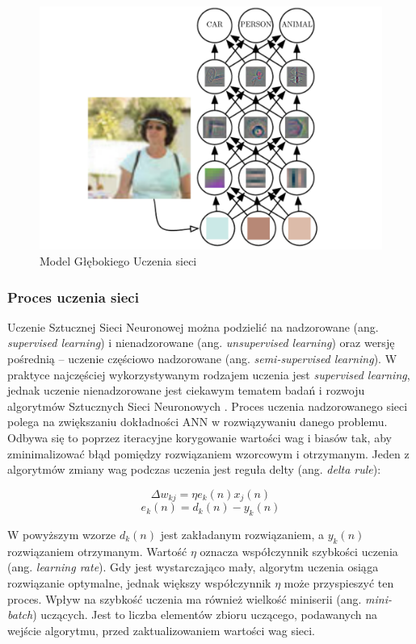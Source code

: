 \begin{figure}[!h]
  \centering
  \includegraphics[width=\textwidth]{img/dnn-object-recog.png}
  \caption{Model Głębokiego Uczenia sieci}
  \label{dnn}
\end{figure}


\subsubsection{Proces uczenia sieci}

Uczenie Sztucznej Sieci Neuronowej można podzielić na nadzorowane (ang. \emph{supervised learning}) i nienadzorowane (ang. \emph{unsupervised learning}) oraz wersję pośrednią -- uczenie częściowo nadzorowane (ang. \emph{semi-supervised learning}). W praktyce najczęściej wykorzystywanym rodzajem uczenia jest \emph{supervised learning}, jednak uczenie nienadzorowane jest ciekawym tematem badań i rozwoju algorytmów Sztucznych Sieci Neuronowych \cite{nielsen2015neural}.
Proces uczenia nadzorowanego sieci polega na zwiększaniu dokładności ANN w rozwiązywaniu danego problemu. Odbywa się to poprzez iteracyjne korygowanie wartości wag i biasów tak, aby zminimalizować błąd pomiędzy rozwiązaniem wzorcowym i otrzymanym. Jeden z algorytmów zmiany wag podczas uczenia jest reguła delty (ang. \emph{delta rule}):


$$\Delta w_{kj} = \eta e_k(n)x_j(n) $$
$$ e_k(n) = d_k(n) - y_k(n) $$

W powyższym wzorze $d_k(n)$ jest zakładanym rozwiązaniem, a $y_k(n)$ rozwiązaniem otrzymanym.
Wartość $\eta$ oznacza współczynnik szybkości uczenia (ang. \emph{learning rate}). Gdy jest wystarczająco mały, algorytm uczenia osiąga rozwiązanie optymalne, jednak większy współczynnik $\eta$ może przyspieszyć ten proces. Wpływ na szybkość uczenia ma również wielkość miniserii (ang. \emph{mini-batch}) uczących. Jest to liczba elementów zbioru uczącego, podawanych na wejście algorytmu, przed zaktualizowaniem wartości wag sieci.

